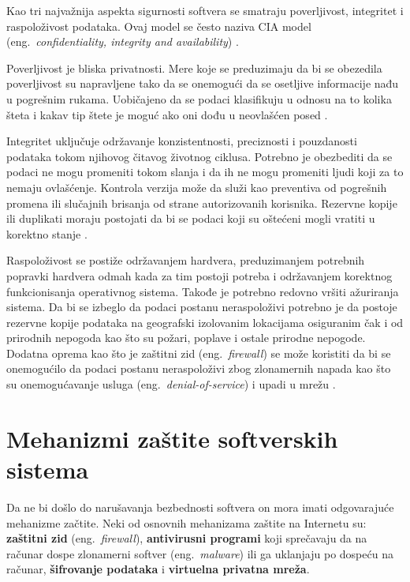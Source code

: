 \documentclass[a4paper]{article}
\begin{document}
Kao tri najvažnija aspekta sigurnosti softvera se smatraju poverljivost, integritet i raspoloživost podataka. Ovaj model se često naziva CIA model (eng.~{\em confidentiality, integrity and availability}) \cite{cia}. 

Poverljivost je bliska privatnosti. Mere koje se preduzimaju da bi se obezedila poverljivost su napravljene tako da se onemogući da se osetljive informacije nađu u pogrešnim rukama. Uobičajeno da se podaci klasifikuju u odnosu na to kolika šteta i kakav tip štete je moguć ako oni dođu u neovlašćen posed \cite{cia}.

Integritet uključuje održavanje konzistentnosti, preciznosti i pouzdanosti podataka tokom njihovog čitavog životnog ciklusa. Potrebno je obezbediti da se podaci ne mogu promeniti tokom slanja i da ih ne mogu promeniti ljudi koji za to nemaju ovlašćenje. Kontrola verzija može da služi kao preventiva od pogrešnih promena ili slučajnih brisanja od strane autorizovanih korisnika. Rezervne kopije ili duplikati moraju postojati da bi se podaci koji su oštećeni mogli vratiti u korektno stanje \cite{cia}.

Raspoloživost se postiže održavanjem hardvera, preduzimanjem potrebnih popravki hardvera odmah kada za tim postoji potreba i održavanjem korektnog funkcionisanja operativnog sistema. Takođe je potrebno redovno vršiti ažuriranja sistema. Da bi se izbeglo da podaci postanu neraspoloživi potrebno je da postoje rezervne kopije podataka na geografski izolovanim lokacijama osiguranim čak i od prirodnih nepogoda kao što su požari, poplave i ostale prirodne nepogode. Dodatna oprema kao što je zaštitni zid (eng.~{\em firewall}) se može koristiti da bi se onemogućilo da podaci postanu neraspoloživi zbog zlonamernih napada kao što su onemogućavanje usluga (eng.~{\em denial-of-service}) i upadi u mrežu \cite{cia}. 


\section{Mehanizmi zaštite softverskih sistema}
\label{sec:mehanizmi zastite softverskih sistema}

Da ne bi došlo do narušavanja bezbednosti softvera on mora imati odgovarajuće mehanizme začtite. Neki od osnovnih mehanizama zaštite na Internetu su: \textbf{zaštitni zid} (eng.~{\em firewall}), \textbf{antivirusni programi} koji sprečavaju da na računar dospe zlonamerni softver (eng.~{\em malware}) ili ga uklanjaju po dospeću na računar, \textbf{šifrovanje podataka} i \textbf{virtuelna privatna mreža}.   
\end{document}
